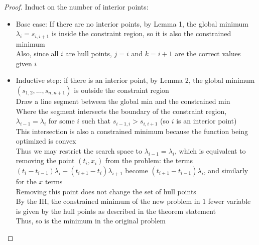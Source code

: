 \documentclass{article}
\begin{document}
\begin{proof}
  Induct on the number of interior points: \\
  \begin{itemize}
    \item
      Base case: If there are no interior points, by Lemma 1, the global minimum $\lambda_i = s_{i,i+1}$ is inside the constraint region,
      so it is also the constrained minimum \\
      Also, since all $i$ are hull points, $j = i$ and $k = i+1$ are the correct values given $i$
    \item
      Inductive step: if there is an interior point, by Lemma 2, the global minimum $(s_{1,2}, \ldots, s_{n,n+1})$ is outside the constraint region \\
      Draw a line segment between the global min and the constrained min \\
      Where the segment intersects the boundary of the constraint region, $\lambda_{i-1} = \lambda_i$ for some $i$ such that $s_{i-1,i} > s_{i,i+1}$ (so $i$ is an interior point) \\
      This intersection is also a constrained minimum because the function being optimized is convex \\
      Thus we may restrict the search space to $\lambda_{i-1} = \lambda_i$,
      which is equivalent to removing the point $(t_i, x_i)$ from the problem:
      the terms $(t_i-t_{i-1})\lambda_i+(t_{i+1}-t_i)\lambda_{i+1}$ become $(t_{i+1}-t_{i-1})\lambda_i$, and similarly for the $x$ terms \\
      Removing this point does not change the set of hull points \\
      By the IH, the constrained minimum of the new problem in $1$ fewer variable is given by the hull points as described in the theorem statement \\
      Thus, so is the minimum in the original problem
  \end{itemize}
\end{proof}
\end{document}

